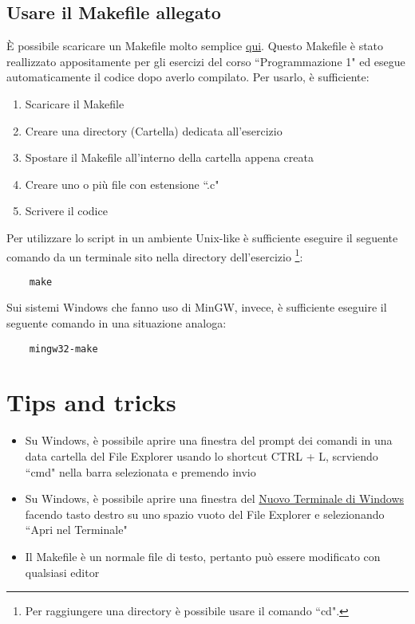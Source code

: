\documentclass{article}
\begin{document}
\subsection{Usare il Makefile allegato}
È possibile scaricare un Makefile molto semplice \href{https://alessandro-salerno.github.io/unito-makefile/Makefile}{qui}. Questo Makefile è stato reallizzato appositamente per gli esercizi del corso ``Programmazione 1" ed esegue automaticamente il codice dopo averlo compilato. Per usarlo, è sufficiente:
\begin{enumerate}
	\item Scaricare il Makefile
	\item Creare una directory (Cartella) dedicata all'esercizio
	\item Spostare il Makefile all'interno della cartella appena creata
	\item Creare uno o più file con estensione ``.c"
	\item Scrivere il codice
\end{enumerate}

\noindent
Per utilizzare lo script in un ambiente Unix-like è sufficiente eseguire il seguente comando da un terminale sito nella directory dell'esercizio \footnote{Per raggiungere una directory è possibile usare il comando ``cd".}:
\begin{verbatim}
    make
\end{verbatim}
\noindent
Sui sistemi Windows che fanno uso di MinGW, invece, è sufficiente eseguire il seguente comando in una situazione analoga:
\begin{verbatim}
    mingw32-make
\end{verbatim}

\section{Tips and tricks}
\begin{itemize}
	\item Su Windows, è possibile aprire una finestra del prompt dei comandi in una data cartella del File Explorer usando lo shortcut CTRL + L, scrviendo ``cmd" nella barra selezionata e premendo invio
	\item Su Windows, è possibile aprire una finestra del \href{https://learn.microsoft.com/it-it/windows/terminal/}{Nuovo Terminale di Windows} facendo tasto destro su uno spazio vuoto del File Explorer e selezionando ``Apri nel Terminale"
	\item Il Makefile è un normale file di testo, pertanto può essere modificato con qualsiasi editor
\end{itemize}
\end{document}
